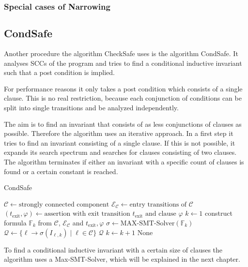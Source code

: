 \subsubsection{Special cases of Narrowing}


\subsection{CondSafe}

Another procedure the algorithm CheckSafe uses is the algorithm CondSafe.
It analyses SCCs of the program and tries to find a conditional inductive invariant such that a post condition is implied.

For performance reasons it only takes a post condition which consists of a single clause.
This is no real restriction, because each conjunction of conditions can be split into single transitions and be analyzed independently.

The aim is to find an invariant that consists of as less conjunctions of clauses as possible.
Therefore the algorithm uses an iterative approach.
In a first step it tries to find an invariant consisting of a single clause.
If this is not possible, it expands its search spectrum and searches for clauses consisting of two clauses.
The algorithm terminates if either an invariant with a specific count of clauses is found or a certain constant is reached.

\begin{algorithm}
\caption{CondSafe}\label{condsafe}
\begin{algorithmic}[1]
\State $\mathcal{C} \gets \text{strongly connected component}$
\State $\mathcal{E}_\mathcal{C} \gets \text{entry transitions of } \mathcal{C}$
\State $(t_\text{exit}, \varphi) \gets \text{assertion with exit transition } t_\text{exit} \text{ and clause } \varphi$
\State $k \gets 1$
\Repeat
  \State construct formula $\mathbb{F}_k$ from $\mathcal{C}$, $\mathcal{E}_\mathcal{C}$ and $t_\text{exit}, \varphi$
  \State $\sigma \gets \text{MAX-SMT-Solver}(\mathbb{F}_k)$
    \State $\mathcal{Q} \gets \lbrace \ell \rightarrow \sigma(I_{\ell, k}) \mid \ell \in \mathcal{C} \rbrace$
    \Return $\mathcal{Q}$
  \EndIf
  \State $k \gets k + 1$
\Return None
\end{algorithmic}
\end{algorithm}

To find a conditional inductive invariant with a certain size of clauses the algorithm uses a Max-SMT-Solver, which will be explained in the next chapter.

